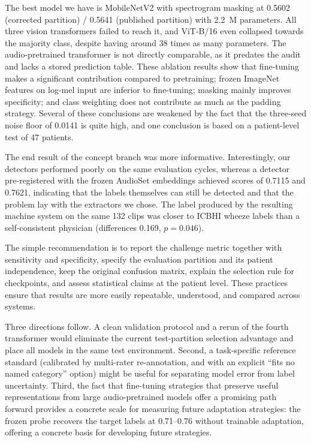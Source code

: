\documentclass[journal,onecolumn]{IEEEtran}
\begin{document}
The best model we have is MobileNetV2 with spectrogram masking at 0.5602 (corrected partition) / 0.5641 (published partition) with 2.2~M parameters. All three vision transformers failed to reach it, and ViT-B/16 even collapsed towards the majority class, despite having around 38 times as many parameters. The audio-pretrained transformer is not directly comparable, as it predates the audit and lacks a stored prediction table. These ablation results show that fine-tuning makes a significant contribution compared to pretraining; frozen ImageNet features on log-mel input are inferior to fine-tuning; masking mainly improves specificity; and class weighting does not contribute as much as the padding strategy. Several of these conclusions are weakened by the fact that the three-seed noise floor of 0.0141 is quite high, and one conclusion is based on a patient-level test of 47 patients.

The end result of the concept branch was more informative. Interestingly, our detectors performed poorly on the same evaluation cycles, whereas a detector pre-registered with the frozen AudioSet embeddings achieved scores of 0.7115 and 0.7621, indicating that the labels themselves can still be detected and that the problem lay with the extractors we chose. The label produced by the resulting machine system on the same 132 clips was closer to ICBHI wheeze labels than a self-consistent physician (differences 0.169, $p=0.046$).

The simple recommendation is to report the challenge metric together with sensitivity and specificity, specify the evaluation partition and its patient independence, keep the original confusion matrix, explain the selection rule for checkpoints, and assess statistical claims at the patient level. These practices ensure that results are more easily repeatable, understood, and compared across systems.

Three directions follow. A clean validation protocol and a rerun of the fourth transformer would eliminate the current test-partition selection advantage and place all models in the same test environment. Second, a task-specific reference standard (calibrated by multi-rater re-annotation, and with an explicit ``fits no named category'' option) might be useful for separating model error from label uncertainty. Third, the fact that fine-tuning strategies that preserve useful representations from large audio-pretrained models offer a promising path forward provides a concrete scale for measuring future adaptation strategies: the frozen probe recovers the target labels at 0.71--0.76 without trainable adaptation, offering a concrete basis for developing future strategies.
\end{document}
